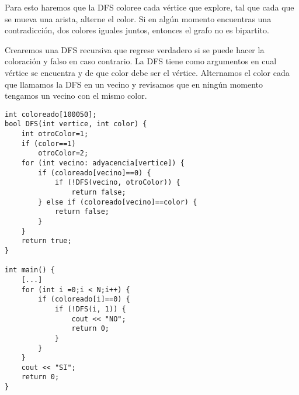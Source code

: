 Para esto haremos que la DFS coloree cada vértice que explore, tal que cada que se mueva una arista, alterne el color. Si en algún momento encuentras una contradicción, dos colores iguales juntos, entonces el grafo no es bipartito.


Crearemos una DFS recursiva que regrese verdadero si se puede hacer la coloración y falso en caso contrario. La DFS tiene como argumentos en cual vértice se encuentra y de que color debe ser el vértice. Alternamos el color cada que llamamos la DFS en un vecino y revisamos que en ningún momento tengamos un vecino con el mismo color.

\begin{minipage}{\linewidth}
\begin{lstlisting}
int coloreado[100050];
bool DFS(int vertice, int color) {
	int otroColor=1;
	if (color==1)
		otroColor=2;
	for (int vecino: adyacencia[vertice]) {
		if (coloreado[vecino]==0) {
			if (!DFS(vecino, otroColor)) {
				return false;
		} else if (coloreado[vecino]==color) {
			return false;
		}
	}
	return true;
}

int main() {
	[...]
	for (int i =0;i < N;i++) {
		if (coloreado[i]==0) {
			if (!DFS(i, 1)) {
				cout << "NO";
				return 0;
			}
		}
	}
	cout << "SI";
	return 0;
}
\end{lstlisting}
\end{minipage}